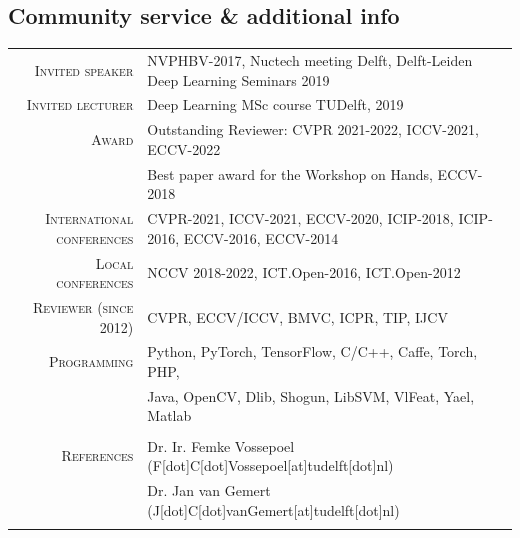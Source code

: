\documentclass[a4paper, oneside, final]{scrartcl}
\begin{document}
\begin{center}
		\section{Community service \& additional info}
		\begin{tabular}{r@{\hskip 0.3in}p{12.3cm}}
            \textsc{Invited speaker}            & NVPHBV-2017, Nuctech meeting Delft, Delft-Leiden Deep Learning Seminars 2019\\
            \textsc{Invited lecturer}           & Deep Learning MSc course TUDelft, 2019\\
            \textsc{Award}                      & Outstanding Reviewer: CVPR 2021-2022, ICCV-2021, ECCV-2022\\ 
                                                & Best paper award for the Workshop on Hands, ECCV-2018\\  
            \textsc{International conferences}  & CVPR-2021, ICCV-2021, ECCV-2020, ICIP-2018, ICIP-2016, ECCV-2016, ECCV-2014\\
            \textsc{Local conferences}          & NCCV 2018-2022, ICT.Open-2016, ICT.Open-2012\\
            \textsc{Reviewer (since 2012)}      & CVPR, ECCV/ICCV, BMVC, ICPR, TIP, IJCV\\
			\textsc{Programming}                & Python, PyTorch, TensorFlow, C\slash C++, Caffe, Torch, PHP,\\ 
			                                    & Java, OpenCV, Dlib, Shogun, LibSVM, VlFeat, Yael, Matlab\\
			\multicolumn{2}{c}{}\\
			\textsc{References} & Dr. Ir. Femke Vossepoel (F[dot]C[dot]Vossepoel[at]tudelft[dot]nl)\\
                                & Dr. Jan van Gemert (J[dot]C[dot]vanGemert[at]tudelft[dot]nl)\\
			\multicolumn{2}{c}{}\\
		\end{tabular}
	\end{center}
\end{document}
